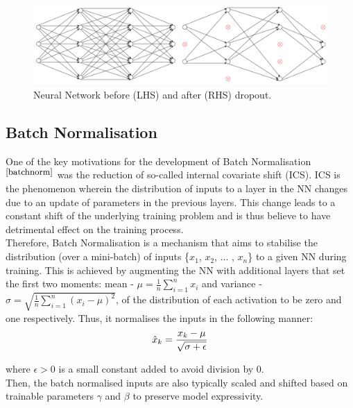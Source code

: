 \begin{figure}[H]
  \centering
  \includegraphics[scale = 0.4]{Images/dropout_new.png}

  \caption{Neural Network before (LHS) and after (RHS) dropout.}
  \label{dropout}
\end{figure}

\subsection{Batch Normalisation}


One of the key motivations for the development of Batch Normalisation$^{\small \cite{batchnorm}}$ was the reduction of so-called internal covariate shift (ICS). ICS is the phenomenon wherein the distribution of inputs to a layer in the NN changes due to an update of parameters in the previous layers. This change leads to a constant shift of the underlying training problem and is thus believe to have detrimental effect on the training process. \\

Therefore, Batch Normalisation is a mechanism that aims to stabilise the distribution (over a mini-batch) of inputs \{$x_1$, $x_2$, ... , $x_n$\} to a given NN during training. This is achieved by augmenting the NN with additional layers that set the first two moments: mean - $\mu = \frac{1}{n} \sum_{i=1}^n x_i$ and variance - $\sigma = \sqrt{\frac{1}{n} \sum_{i=1}^n (x_i - \mu) ^ 2}$, of the distribution of each activation to be zero and one respectively. Thus, it normalises the inputs in the following manner: \\

\begin{equation}
  \centering
  \hat{x}_k = \frac{x_k - \mu}{\sqrt{\sigma + \epsilon}}
\end{equation}

where $\epsilon > 0$ is a small constant added to avoid division by 0. \\

Then, the batch normalised inputs are also typically scaled and shifted based on trainable parameters $\gamma$ and $\beta$ to preserve model expressivity. \\

